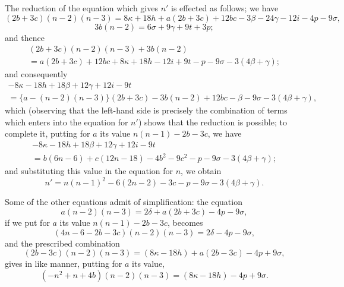 \documentclass[11pt,a4paper]{book}
\theoremstyle{plain}
\begin{document}
The reduction of the equation which gives $n'$ is effected as follows; we have
\[
(2b+3c)(n-2)(n-3)=8\kappa+18h+a(2b+3c)+12bc-3\beta-24\gamma-12i-4p-9\sigma,
\]
\[
3b(n-2)=6\sigma+9\gamma+9t+3p;
\]
and thence
\begin{multline*}
(2b+3c)(n-2)(n-3)+3b(n-2)\\
=a(2b+3c)+12bc+8\kappa+18h-12i+9t-p-9\sigma-3(4\beta+\gamma);
\end{multline*}
and consequently
\begin{multline*}
-8\kappa-18h+18\beta+12\gamma+12i-9t\\
=\{a-(n-2)(n-3)\}(2b+3c)-3b(n-2)+12bc-\beta-9\sigma-3(4\beta+\gamma),
\end{multline*}
which (observing that the left-hand side is precisely the combination of terms which enters into the equation for $n'$) shows that the reduction is possible; to complete it, putting for $a$ its value $n(n-1)-2b-3c$, we have
\begin{multline*}
-8\kappa-18h+18\beta+12\gamma+12i-9t\\
=b(6n-6)+c(12n-18)-4b^2-9c^2-p-9\sigma-3(4\beta+\gamma);
\end{multline*}
and substituting this value in the equation for $n$, we obtain
\[
n'=n(n-1)^2-6(2n-2)-3c-p-9\sigma-3(4\beta+\gamma).
\]

Some of the other equations admit of simplification: the equation
\[
a(n-2)(n-3)=2\delta+a(2b+3c)-4p-9\sigma,
\]
if we put for $a$ its value $n(n-1)-2b-3c$, becomes
\[
(4n-6-2b-3c)(n-2)(n-3)=2\delta-4p-9\sigma,
\]
and the prescribed combination
\[
(2b-3c)(n-2)(n-3)=(8\kappa-18h)+a(2b-3c)-4p+9\sigma,
\]
gives in like manner, putting for $a$ its value,
\[
(-n^2+n+4b)(n-2)(n-3)=(8\kappa-18h)-4p+9\sigma.
\]
\end{document}
